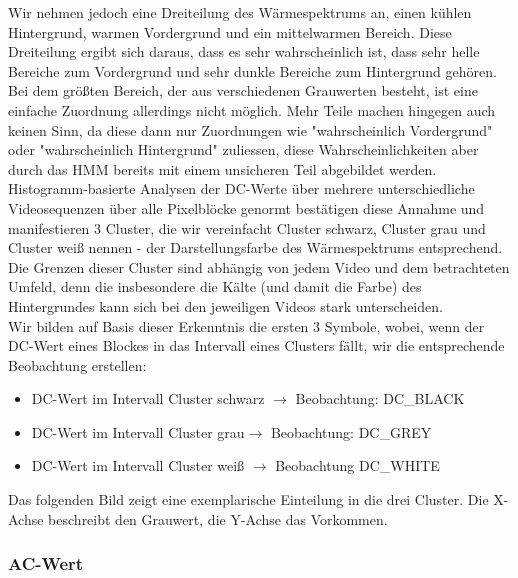 Wir nehmen jedoch eine Dreiteilung des Wärmespektrums an, einen kühlen Hintergrund, warmen Vordergrund und ein mittelwarmen Bereich.
Diese Dreiteilung ergibt sich daraus, dass es sehr wahrscheinlich ist, dass sehr helle Bereiche zum Vordergrund und sehr dunkle Bereiche zum Hintergrund gehören.
Bei dem größten Bereich, der aus verschiedenen Grauwerten besteht, ist eine einfache Zuordnung allerdings nicht möglich. Mehr Teile machen hingegen auch keinen Sinn, da diese dann nur Zuordnungen wie "wahrscheinlich Vordergrund" oder "wahrscheinlich Hintergrund" zuliessen, diese Wahrscheinlichkeiten aber durch das HMM bereits mit einem unsicheren Teil abgebildet werden.
Histogramm-basierte Analysen der DC-Werte über mehrere unterschiedliche Videosequenzen über alle Pixelblöcke genormt bestätigen diese Annahme und manifestieren 3 Cluster, die wir vereinfacht Cluster schwarz, Cluster grau und Cluster weiß nennen - der Darstellungsfarbe des Wärmespektrums entsprechend.
Die Grenzen dieser Cluster sind abhängig von jedem Video und dem betrachteten Umfeld, denn die insbesondere die Kälte (und damit die Farbe) des Hintergrundes kann sich bei den jeweiligen Videos stark unterscheiden.\\
Wir bilden auf Basis dieser Erkenntnis die ersten 3 Symbole, wobei, wenn der DC-Wert eines Blockes in das Intervall eines Clusters fällt, wir die entsprechende Beobachtung erstellen:
\begin{itemize}
	\item DC-Wert im Intervall Cluster schwarz $\rightarrow$ Beobachtung: DC\_BLACK
	\item DC-Wert im Intervall Cluster grau$\rightarrow$ Beobachtung: DC\_GREY
	\item DC-Wert im Intervall Cluster weiß $\rightarrow$ Beobachtung DC\_WHITE
\end{itemize}
Das folgenden Bild zeigt eine exemplarische Einteilung in die drei Cluster.
Die X-Achse beschreibt den Grauwert, die Y-Achse das Vorkommen.

\subsubsection{AC-Wert}

